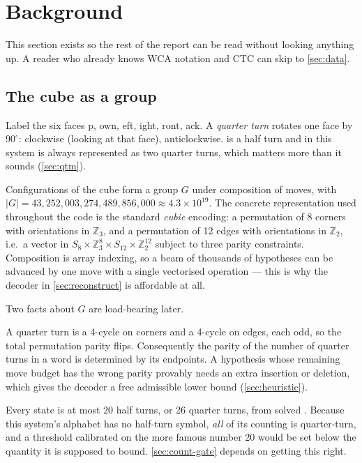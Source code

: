 \section{Background}
\label{sec:background}

This section exists so the rest of the report can be read without looking
anything up. A reader who already knows WCA notation and CTC can skip to
\cref{sec:data}.

\subsection{The cube as a group}

Label the six faces p, own, eft, ight,
ront, ack. A \emph{quarter turn} rotates one face by
$90^\circ$:  clockwise (looking at that face), 
anticlockwise.  is a half turn and in this system is always
represented as two quarter turns, which matters more than it sounds
(\cref{sec:qtm}).

Configurations of the cube form a group $G$ under composition of moves,
with $|G| = 43{,}252{,}003{,}274{,}489{,}856{,}000 \approx 4.3\times10^{19}$.
The concrete representation used throughout the code is the standard
\emph{cubie} encoding: a permutation of 8 corners with orientations in
$\mathbb{Z}_3$, and a permutation of 12 edges with orientations in
$\mathbb{Z}_2$, i.e.\ a vector in
$S_8 \times \mathbb{Z}_3^8 \times S_{12} \times \mathbb{Z}_2^{12}$ subject
to three parity constraints. Composition is array indexing, so a beam of
thousands of hypotheses can be advanced by one move with a single vectorised
operation --- this is why the decoder in \cref{sec:reconstruct} is
affordable at all.

Two facts about $G$ are load-bearing later.

\begin{description}[leftmargin=1.2em,style=nextline,itemsep=2pt]
\item[Every quarter turn flips permutation parity.] A quarter turn is a
4-cycle on corners and a 4-cycle on edges, each odd, so the total
permutation parity flips. Consequently the parity of the number of quarter
turns in a word is determined by its endpoints. A hypothesis whose remaining
move budget has the wrong parity provably needs an extra insertion or
deletion, which gives the decoder a free admissible lower bound
(\cref{sec:heuristic}).
\item[God's number is 20 in the half-turn metric and 26 in the quarter-turn
metric.] \label{sec:qtm} Every state is at most 20 half turns, or 26 quarter
turns, from solved \cite{rokicki2014,rokicki2010}. Because this system's
alphabet has no half-turn symbol, \emph{all} of its counting is
quarter-turn, and a threshold calibrated on the more famous number 20 would
be set below the quantity it is supposed to bound. \cref{sec:count-gate}
depends on getting this right.
\end{description}

